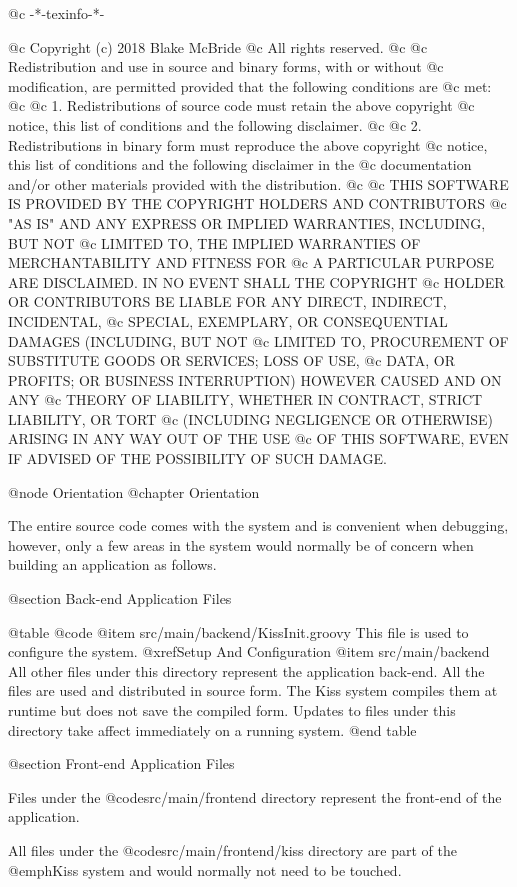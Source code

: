 @c -*-texinfo-*-

@c  Copyright (c) 2018 Blake McBride
@c  All rights reserved.
@c
@c  Redistribution and use in source and binary forms, with or without
@c  modification, are permitted provided that the following conditions are
@c  met:
@c
@c  1. Redistributions of source code must retain the above copyright
@c  notice, this list of conditions and the following disclaimer.
@c
@c  2. Redistributions in binary form must reproduce the above copyright
@c  notice, this list of conditions and the following disclaimer in the
@c  documentation and/or other materials provided with the distribution.
@c
@c  THIS SOFTWARE IS PROVIDED BY THE COPYRIGHT HOLDERS AND CONTRIBUTORS
@c  "AS IS" AND ANY EXPRESS OR IMPLIED WARRANTIES, INCLUDING, BUT NOT
@c  LIMITED TO, THE IMPLIED WARRANTIES OF MERCHANTABILITY AND FITNESS FOR
@c  A PARTICULAR PURPOSE ARE DISCLAIMED. IN NO EVENT SHALL THE COPYRIGHT
@c  HOLDER OR CONTRIBUTORS BE LIABLE FOR ANY DIRECT, INDIRECT, INCIDENTAL,
@c  SPECIAL, EXEMPLARY, OR CONSEQUENTIAL DAMAGES (INCLUDING, BUT NOT
@c  LIMITED TO, PROCUREMENT OF SUBSTITUTE GOODS OR SERVICES; LOSS OF USE,
@c  DATA, OR PROFITS; OR BUSINESS INTERRUPTION) HOWEVER CAUSED AND ON ANY
@c  THEORY OF LIABILITY, WHETHER IN CONTRACT, STRICT LIABILITY, OR TORT
@c  (INCLUDING NEGLIGENCE OR OTHERWISE) ARISING IN ANY WAY OUT OF THE USE
@c  OF THIS SOFTWARE, EVEN IF ADVISED OF THE POSSIBILITY OF SUCH DAMAGE.


@node Orientation
@chapter Orientation


The entire source code comes with the system and is convenient when
debugging, however, only a few areas in the system would normally be
of concern when building an application as follows.


@section Back-end Application Files

@table @code
@item src/main/backend/KissInit.groovy
This file is used to configure the system. @xref{Setup And Configuration}
@item src/main/backend
All other files under this directory represent the application
back-end.  All the files are used and distributed in source form.  The
Kiss system compiles them at runtime but does not save the compiled form.
Updates to files under this directory take affect
immediately on a running system.
@end table


@section Front-end Application Files

Files under the @code{src/main/frontend} directory represent the
front-end of the application.

All files under the @code{src/main/frontend/kiss} directory are part of
the @emph{Kiss} system and would normally not need to be touched.

